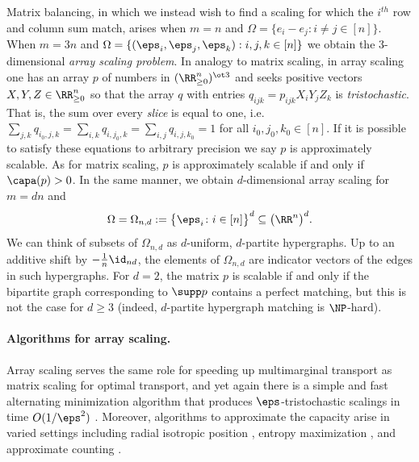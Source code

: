 Matrix balancing, in which we instead wish to find a scaling for which the $i^{th}$ row and column sum match, arises when $m = n$ and $\Omega = \{e_i - e_j: i\neq j \in [n]\}$. When $m = 3n$ and $\Omega = \{(\eps_i, \eps_j, \eps_k): i,j,k \in [n]\}$ we obtain the $3$-dimensional \emph{array scaling problem}. In analogy to matrix scaling, in array scaling one has an array $p$ of numbers in $(\RR^n_{\geq 0})^{\ot 3}$ and seeks positive vectors $X,Y,Z \in \RR^n_{\geq 0}$ so that the array $q$ with entries $q_{ijk} =p_{ijk}X_i Y_j Z_k$ is \emph{tristochastic}. That is, the sum over every \emph{slice} is equal to one, i.e.
    $\sum_{j,k} q_{i_0,j,k} = \sum_{i,k} q_{i,j_0,k} = \sum_{i,j} q_{i,j,k_0} = 1$
for all $i_0,j_0,k_0 \in [n]$. If it is possible to satisfy these equations to arbitrary precision we say $p$ is approximately scalable. As for matrix scaling, $p$ is approximately scalable if and only if $\capa(p) > 0$. In the same manner, we obtain $d$-dimensional array scaling for $m=dn$ and
	\begin{equation}\label{eq:defnOmega-n-d}
	\Omega = \Omega_{n,d} := \big\lbrace \eps_i \colon i \in [n] \big\rbrace^d \subseteq \big( \RR^n \big)^d.
	\end{equation}
We can think of subsets of $\Omega_{n,d}$ as $d$-uniform, $d$-partite hypergraphs. Up to an additive shift by $- \frac{1}{n} \id_{nd}$, the elements of $\Omega_{n,d}$ are indicator vectors of the edges in such hypergraphs. For $d = 2$, the matrix $p$ is scalable if and only if the bipartite graph corresponding to $\supp p$ contains a perfect matching, but this is not the case for $d \geq 3$ (indeed, $d$-partite hypergraph matching is $\NP$-hard).



\paragraph{Algorithms for array scaling.}

Array scaling serves the same role for speeding up multimarginal transport as matrix scaling for optimal transport, and yet again there is a simple and fast alternating minimization algorithm that produces $\eps$-tristochastic scalings in time $O(1/\eps^2)$ \cite{altschuler2020polynomial,lin2019complexity}.
Moreover, algorithms to approximate the capacity arise in varied settings including radial isotropic position \cite{hardt2013algorithms}, entropy maximization \cite{straszak2017computing}, and approximate counting \cite{anari2018log}.  
 

